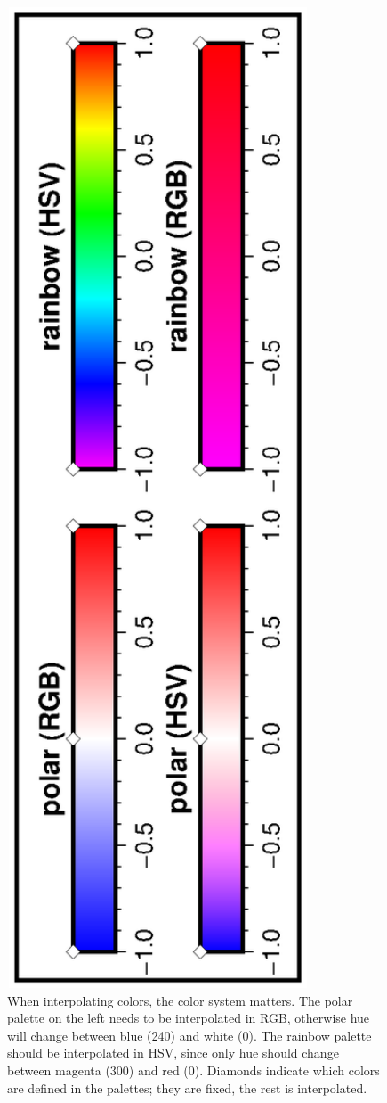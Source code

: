 \begin{figure}[h]
   \centering
   \includegraphics[width=0.80\textwidth]{scripts/GMT_color_interpolate}%
   \caption{When interpolating colors, the color system matters. The polar palette on the left needs to be interpolated in RGB, otherwise hue will change between blue (240\DS) and white (0\DS). The rainbow palette should be interpolated in HSV, since only hue should change between magenta (300\DS) and red (0\DS). Diamonds indicate which colors are defined in the palettes; they are fixed, the rest is interpolated.}
   \label{fig:GMT_color_interpolate}
\end{figure}

